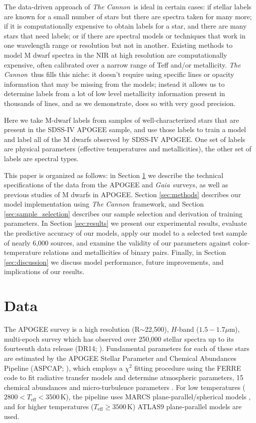 \documentclass[twocolumn]{aastex62}
\newcommand{\thecannon}{\textsl{The Cannon}}
\newcommand{\gaia}{\textsl{Gaia}}
\newcommand{\teff}{T_{\mathrm{eff}}}
\begin{document}
The data-driven approach of \thecannon\ is ideal in certain cases:
if stellar labels are known for a small number of stars
but there are spectra taken for many more;
if it is computationally expensive to obtain labels for a star, and
there are many stars that need labels;
or if there are spectral models or techniques that work in one wavelength range or resolution but not in another.
Existing methods to model M dwarf spectra in the NIR at high resolution are computationally expensive, often calibrated over a narrow range of Teff and/or metallicity. \thecannon\ thus fills this niche: it doesn't require using specific lines or opacity information that may be missing from the models; instead it allows us to determine labels from a lot of low level metallicity information present in thousands of lines, and as we demonstrate, does so with very good precision.

Here we take M-dwarf labels from samples of well-characterized stars that are present in the
SDSS-IV APOGEE sample, and use those labels to train a model and label all of the M dwarfs observed by
SDSS-IV APOGEE. One set of labels are physical parameters (effective temperatures and metallicities), the other set of labels are spectral types. 

This paper is organized as follows: in Section \ref{sec:data} we describe the technical specifications of the data from the APOGEE and \gaia\ surveys, as well as previous studies of M dwarfs in APOGEE.
Section \ref{sec:methods} describes our model implementation using \thecannon\ framework, and Section \ref{sec:sample_selection} describes our sample selection and derivation of training parameters.
In Section \ref{sec:results} we present our experimental results, evaluate the predictive accuracy of our models, apply our model to a selected test sample of nearly 6,000 sources, and examine the validity of our parameters against color-temperature relations and metallicities of binary pairs.
Finally, in Section \ref{sec:discussion} we discuss model performance, future improvements, and implications of our results. 


\section{Data} \label{sec:data}

The APOGEE survey is a high resolution (R$\sim$22,500), $H$-band ($1.5-1.7\mu$m), multi-epoch survey which has observed over 250,000 stellar spectra up to its fourteenth data release (DR14; \citealt{Abolfathi:2017}). Fundamental parameters for each of these stars are estimated by the APOGEE Stellar Parameter and Chemical Abundances Pipeline (ASPCAP; \citealt{Perez:2016}), which employs a $\chi^2$ fitting procedure using the FERRE code to fit radiative transfer models and determine atmospheric parameters, 15 chemical abundances and micro-turbulence parameters \citep{Meszaros:2012}. For low temperatures ($2800<\teff<3500$\,K), the pipeline uses MARCS plane-parallel/spherical models \citep{Gustafsson:2008}, and for higher temperatures ($\teff\geq3500$\,K) ATLAS9 \citep{Castelli:2004} plane-parallel models are used.
\end{document}
